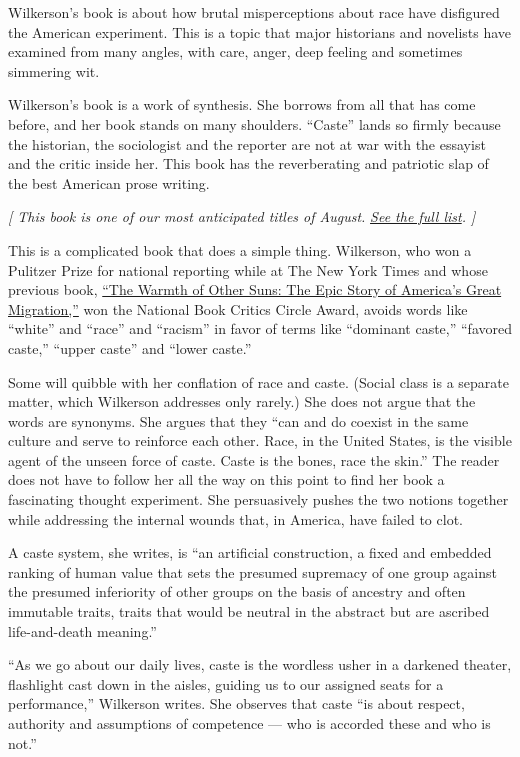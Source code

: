 Wilkerson's book is about how brutal misperceptions about race have
disfigured the American experiment. This is a topic that major
historians and novelists have examined from many angles, with care,
anger, deep feeling and sometimes simmering wit.

Wilkerson's book is a work of synthesis. She borrows from all that has
come before, and her book stands on many shoulders. ``Caste'' lands so
firmly because the historian, the sociologist and the reporter are not
at war with the essayist and the critic inside her. This book has the
reverberating and patriotic slap of the best American prose writing.

\emph{{[} This book is one of our most anticipated titles of August.}
\href{https://www.nytimes3xbfgragh.onion/2020/07/30/books/new-august-books.html}{\emph{See
the full list}}\emph{. {]}}

This is a complicated book that does a simple thing. Wilkerson, who won
a Pulitzer Prize for national reporting while at The New York Times and
whose previous book,
\href{https://www.nytimes3xbfgragh.onion/2010/09/05/books/review/Oshinsky-t.html}{``The
Warmth of Other Suns: The Epic Story of America's Great Migration,''}
won the National Book Critics Circle Award, avoids words like ``white''
and ``race'' and ``racism'' in favor of terms like ``dominant caste,''
``favored caste,'' ``upper caste'' and ``lower caste.''

Some will quibble with her conflation of race and caste. (Social class
is a separate matter, which Wilkerson addresses only rarely.) She does
not argue that the words are synonyms. She argues that they ``can and do
coexist in the same culture and serve to reinforce each other. Race, in
the United States, is the visible agent of the unseen force of caste.
Caste is the bones, race the skin.'' The reader does not have to follow
her all the way on this point to find her book a fascinating thought
experiment. She persuasively pushes the two notions together while
addressing the internal wounds that, in America, have failed to clot.

A caste system, she writes, is ``an artificial construction, a fixed and
embedded ranking of human value that sets the presumed supremacy of one
group against the presumed inferiority of other groups on the basis of
ancestry and often immutable traits, traits that would be neutral in the
abstract but are ascribed life-and-death meaning.''

``As we go about our daily lives, caste is the wordless usher in a
darkened theater, flashlight cast down in the aisles, guiding us to our
assigned seats for a performance,'' Wilkerson writes. She observes that
caste ``is about respect, authority and assumptions of competence ---
who is accorded these and who is not.''

